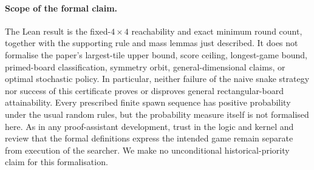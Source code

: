 \paragraph{Scope of the formal claim.}
The Lean result is the fixed-$4\times4$ reachability and exact minimum
round count, together with the supporting rule and mass lemmas just
described. It does not formalise the paper's largest-tile upper bound,
score ceiling, longest-game bound, primed-board classification, symmetry
orbit, general-dimensional claims, or optimal stochastic policy.
In particular, neither failure of the naive snake strategy nor success
of this certificate proves or disproves general rectangular-board
attainability. Every prescribed finite spawn sequence has positive
probability under the usual random rules, but the probability measure
itself is not formalised here. As in any proof-assistant development,
trust in the logic and kernel and review that the formal definitions
express the intended game remain separate from execution of the searcher.
We make no unconditional historical-priority claim for this formalisation.



